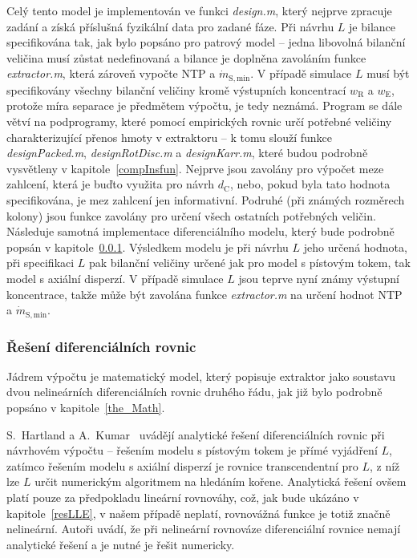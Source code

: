 Celý tento model je implementován ve funkci \textit{design.m}, který nejprve zpracuje zadání a získá příslušná fyzikální data pro zadané fáze.
Při návrhu $L$ je bilance specifikována tak, jak bylo popsáno pro patrový model -- jedna libovolná bilanční veličina musí zůstat nedefinovaná a bilance je doplněna zavoláním funkce \textit{extractor.m}, která zároveň vypočte NTP a $\dot{m}_\mathrm{S,min}$.
V případě simulace $L$ musí být specifikovány všechny bilanční veličiny kromě výstupních koncentrací $w_\mathrm{R}$ a $w_\mathrm{E}$, protože míra separace je předmětem výpočtu, je tedy neznámá.
Program se dále větví na podprogramy, které pomocí empirických rovnic určí potřebné veličiny charakterizující přenos hmoty v extraktoru -- k tomu slouží funkce \textit{designPacked.m}, \textit{designRotDisc.m} a \textit{designKarr.m}, které budou podrobně vysvětleny v kapitole~\ref{compInsfun}.
Nejprve jsou zavolány pro výpočet meze zahlcení, která je buďto využita pro návrh $d_\mathrm{C}$, nebo, pokud byla tato hodnota specifikována, je mez zahlcení jen informativní.
Podruhé (při známých rozměrech kolony) jsou funkce zavolány pro určení všech ostatních potřebných veličin.
Následuje samotná implementace diferenciálního modelu, který bude podrobně popsán v kapitole~\ref{compDiff}.
Výsledkem modelu je při návrhu $L$ jeho určená hodnota, při specifikaci $L$ pak bilanční veličiny určené jak pro model s pístovým tokem, tak model s axiální disperzí.
V případě simulace $L$ jsou teprve nyní známy výstupní koncentrace, takže může být zavolána funkce \textit{extractor.m} na určení hodnot NTP a $\dot{m}_\mathrm{S,min}$.

\subsubsection{Řešení diferenciálních rovnic} \label{compDiff}
Jádrem výpočtu je matematický model, který popisuje extraktor jako soustavu dvou nelineárních diferenciálních rovnic druhého řádu, jak již bylo podrobně popsáno v kapitole~\ref{the_Math}.

S.~Hartland a A.~Kumar~\cite{HartlandKumar1997} uvádějí analytické řešení diferenciálních rovnic při návrhovém výpočtu -- řešením modelu s pístovým tokem je přímé vyjádření $L$, zatímco řešením modelu s axiální disperzí je rovnice transcendentní pro $L$, z níž lze $L$ určit numerickým algoritmem na hledáním kořene.
Analytická řešení ovšem platí pouze za předpokladu lineární rovnováhy, což, jak bude ukázáno v kapitole~\ref{resLLE}, v našem případě neplatí, rovnovážná funkce je totiž značně nelineární.
Autoři uvádí, že při nelineární rovnováze diferenciální rovnice nemají analytické řešení a je nutné je řešit numericky.

